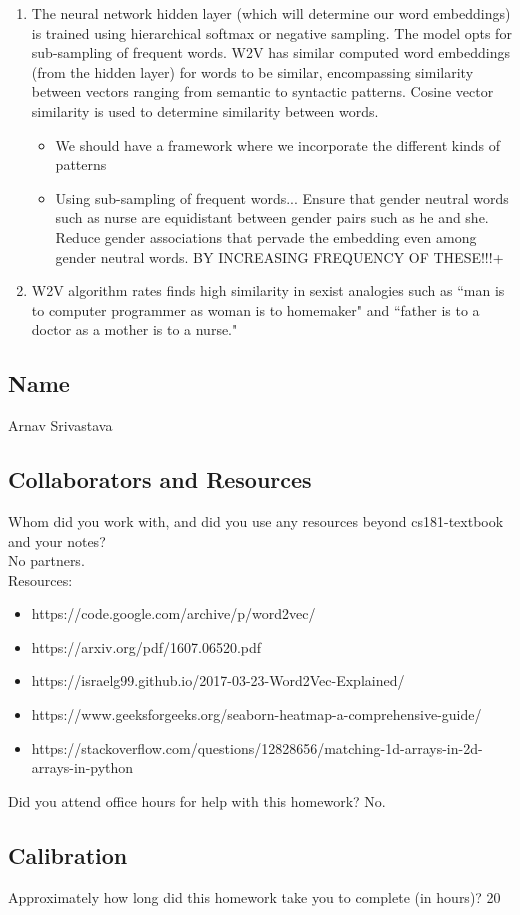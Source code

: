 \documentclass[submit]{harvardml}
\begin{document}
\begin{enumerate}
\begin{itemize}
    \end{itemize}
    \item The neural network hidden layer (which will determine our word embeddings) is trained using hierarchical softmax or negative sampling. The model opts for sub-sampling of frequent words. W2V has similar computed word embeddings (from the hidden layer) for words to be similar, encompassing similarity between vectors ranging from semantic to syntactic patterns. Cosine vector similarity is used to determine similarity between words.
    \begin{itemize}
        \item We should have a framework where we incorporate the different kinds of patterns 
        \item Using sub-sampling of frequent words...  Ensure that gender neutral words such as nurse are equidistant between gender pairs such as he and she. Reduce gender associations that pervade the embedding even among gender neutral words. BY INCREASING FREQUENCY OF THESE!!!+
    \end{itemize}
    \item W2V algorithm rates finds high similarity in sexist analogies such as ``man is to
computer programmer as woman is to homemaker" and ``father is to a doctor as a mother is to a nurse."

\end{enumerate}
\newpage
\subsection*{Name}
Arnav Srivastava
\subsection*{Collaborators and Resources}
Whom did you work with, and did you use any resources beyond cs181-textbook and your notes?\\
No partners.
\\
Resources:
\begin{itemize}
    \item https://code.google.com/archive/p/word2vec/
    \item https://arxiv.org/pdf/1607.06520.pdf
    \item https://israelg99.github.io/2017-03-23-Word2Vec-Explained/ 
    \item https://www.geeksforgeeks.org/seaborn-heatmap-a-comprehensive-guide/
    \item https://stackoverflow.com/questions/12828656/matching-1d-arrays-in-2d-arrays-in-python
\end{itemize}
Did you attend office hours for help with this homework?
No.
\subsection*{Calibration}
Approximately how long did this homework take you to complete (in hours)? 
20
\end{document}
